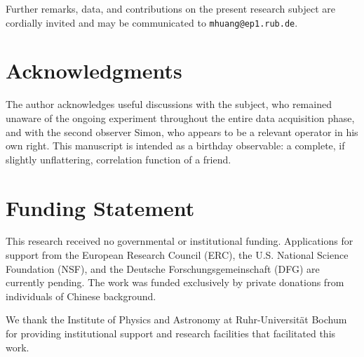\documentclass[10pt,twocolumn]{article}
\begin{document}
Further remarks, data, and contributions on the present research
subject are cordially invited and may be communicated to
\texttt{mhuang@ep1.rub.de}.

\section*{Acknowledgments}

The author acknowledges useful discussions with the subject,
who remained unaware of the ongoing experiment throughout the
entire data acquisition phase, and with the second observer
Simon, who appears to be a relevant operator in his own right.
This manuscript is intended as a birthday observable:
a complete, if slightly unflattering, correlation function
of a friend.

\section*{Funding Statement}

This research received no governmental or institutional funding. Applications for support from the European Research Council (ERC), the U.S. National Science Foundation (NSF), and the Deutsche Forschungsgemeinschaft (DFG) are currently pending. The work was funded exclusively by private donations from individuals of Chinese background.

We thank the Institute of Physics and Astronomy at Ruhr-Universität Bochum for providing institutional support and research facilities that facilitated this work.
\end{document}
